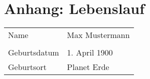\chapter{Anhang: Lebenslauf}
\label{ch:anhang_lebenslauf}

\renewcommand{\arraystretch}{1}
\begin{table}[!htb]
\centering
\begin{tabularx}{\textwidth}{X l}

Name & Max Mustermann \\
\\
Geburtsdatum & 1. April 1900 \\
Geburtsort & Planet Erde \\
\end{tabularx}
\end{table}
\renewcommand{\arraystretch}{1}